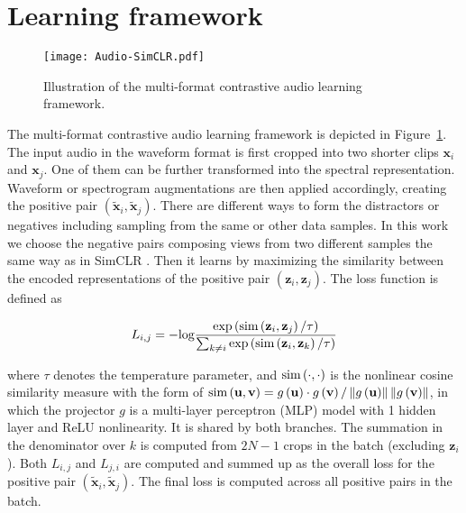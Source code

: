 \documentclass{article}
\begin{document}
\section{Learning framework}

\begin{figure}[t]
  \centering
  \texttt{[image: Audio-SimCLR.pdf]}
  \caption{Illustration of the multi-format contrastive audio learning framework.}
  \label{fig:framework}
\end{figure}

The multi-format contrastive audio learning framework is depicted in Figure~\ref{fig:framework}. The input audio in the waveform format is first cropped into two shorter clips $\mathbf{x}_i$ and $\mathbf{x}_j$. One of them can be further transformed into the spectral representation. Waveform or spectrogram augmentations are then applied accordingly, creating the positive pair $\left(\mathbf{\widetilde{x}}_i, \mathbf{\widetilde{x}}_j\right)$. There are different ways to form the distractors or negatives including sampling from the same or other data samples. In this work we choose the negative pairs composing views from two different samples the same way as in SimCLR \cite{chen2020simple}. Then it learns by maximizing the similarity between the encoded representations of the positive pair $\left(\mathbf{z}_i, \mathbf{z}_j\right)$. The loss function is defined as

\begin{equation}\label{eq1}
  L_{i,j} = -\textup{log} \frac{\exp{\left( \textup{sim} \left( \mathbf{z}_i, \mathbf{z}_j \right) / \tau \right)} }{\sum_{k \ne i} \exp{\left( \textup{sim} \left( \mathbf{z}_i, \mathbf{z}_k \right) / \tau \right)} }
\end{equation}

where $\tau$ denotes the temperature parameter, and $\textup{sim} \left( \cdot, \cdot \right)$ is the nonlinear cosine similarity measure with the form of $\textup{sim}\left ( \mathbf{u}, \mathbf{v} \right ) = g\left ( \mathbf{u} \right ) \cdot g\left ( \mathbf{v} \right ) / \left \|  g\left ( \mathbf{u} \right ) \right \| \left \|  g\left ( \mathbf{v} \right ) \right \|$, in which the projector $g$ is a multi-layer perceptron (MLP) model with 1 hidden layer and ReLU nonlinearity. It is shared by both branches.
The summation in the denominator over $k$ is computed from $2N - 1$ crops in the batch (excluding $\mathbf{z}_i$).
Both $L_{i,j}$ and $L_{j,i}$ are computed and summed up as the overall loss for the positive pair $\left(\mathbf{\widetilde{x}}_i, \mathbf{\widetilde{x}}_j\right)$. The final loss is computed across all positive pairs in the batch.
\end{document}
